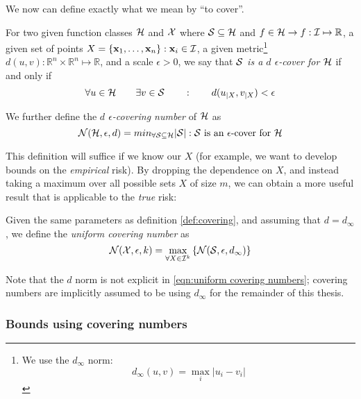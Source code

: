We now can define exactly what we mean by ``to cover''.

\begin{definition}
\label{def:covering}
\label{def:covering numbers}
For two given function classes $\mathcal{H}$ and $\mathcal{X}$ where $\mathcal{S}
\subseteq \mathcal{H}$ and $f \in \mathcal{H} \rightarrow f : \mathcal{I} \mapsto
\mathbb{R}$, a given set of points $X = \{\mathbf{x}_1, \ldots, \mathbf{x}_n\} : \mathbf{x}_i \in
\mathcal{I}$, a given metric\footnote{We use the $d_{\infty}$ norm: 
\[ d_{\infty}(u, v) = \max_{i} |u_i - v_i| \]} $d(u, v) : \mathbb{R}^n
\times \mathbb{R}^n \mapsto 
\mathbb{R}$, and a scale $\epsilon > 0$, we say that \emph{$\mathcal{S}$ is a
$d$ $\epsilon$-cover for $\mathcal{H}$} if and only if
\begin{equation}
\forall u \in \mathcal{H} \qquad \exists v \in \mathcal{S} \qquad : \qquad
d(u_{|X}, v_{|X}) < \epsilon
\end{equation}

We further define the \emph{$d$ $\epsilon$-covering number} of $\mathcal{H}$
as 
\begin{equation}
\mathcal{N}({\mathcal{H}}, {\epsilon}, {d}) = min_{\forall \mathcal{S} \subseteq
\mathcal{H}}|\mathcal{S}| : \mbox{$\mathcal{S}$ is an $\epsilon$-cover for $\mathcal{H}$}
\end{equation}
\end{definition}

This definition will suffice if we know our $X$ (for example, we want
to develop bounds on the \emph{empirical} risk).  By dropping the dependence
on $X$, and instead taking a maximum over all possible sets $X$
of size $m$, we can obtain a more useful result that is applicable to the
\emph{true} risk:

\begin{definition}
Given the same parameters as definition \ref{def:covering}, and
assuming that $d = d_{\infty}$, we define
the \emph{uniform covering number} as
\begin{equation}
\label{eqn:uniform covering numbers}
\mathcal{N}({\mathcal{X}}, {\epsilon}, {k}) = \max_{\forall X \in \mathcal{I}^k} \left\{
\mathcal{N}({\mathcal{S}}, {\epsilon}, {d_{\infty}}) \right\} 
\end{equation}
\end{definition}

Note that the $d$ norm is not explicit in \ref{eqn:uniform covering
numbers}; covering numbers are implicitly assumed to be using
$d_{\infty}$ for the remainder of this thesis.

\subsubsection{Bounds using covering numbers}
\label{sec:covering number bounds}

